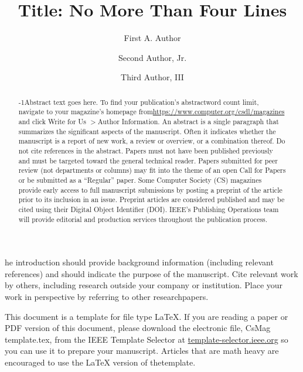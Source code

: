 \documentclass{IEEEcsmag}
\begin{document}

\title{Title: No More Than Four Lines}

\author{First A. Author}

\author{Second Author, Jr.}

\author{Third Author, III}


\begin{abstract}\looseness-1Abstract text goes here. To find your publication's abstract\break word count limit, navigate to your magazine's homepage from\break \href{https://www.computer.org/csdl/magazines}{https://www.computer.org/csdl/magazines} and click Write for Us $>$Author Information. An abstract is a single paragraph that summarizes the significant aspects of the manuscript. Often it indicates whether the manuscript is a report of new work, a review or overview, or a combination thereof. Do not cite references in the abstract. Papers must not have been published previously and must be targeted toward the general technical reader. Papers submitted for peer review (not departments or columns) may fit into the theme of an open Call for Papers or be submitted as a ``Regular'' paper. Some Computer Society (CS) magazines provide early access to full manuscript submissions by posting a preprint of the article prior to its inclusion in an issue. Preprint articles are considered published and may be cited using their Digital Object Identifier (DOI). IEEE's Publishing Operations team will provide editorial and production services throughout the publication process.
\end{abstract}

\maketitle


he introduction should provide background information (including relevant references) and should indicate the purpose of the manuscript. Cite relevant work by others, including research outside your company or institution. Place your work in perspective by referring to other research\break papers.


This document is a template for file type LaTeX. If you are reading a paper or PDF version of this document, please download the electronic file, CsMag template.tex, from the IEEE Template Selector at \href{https://template-selector.ieee.org}{template-selector.ieee.org} so you can use it to prepare your manuscript. Articles that are math heavy are encouraged to use the LaTeX version of the\break  template.
\end{document}
